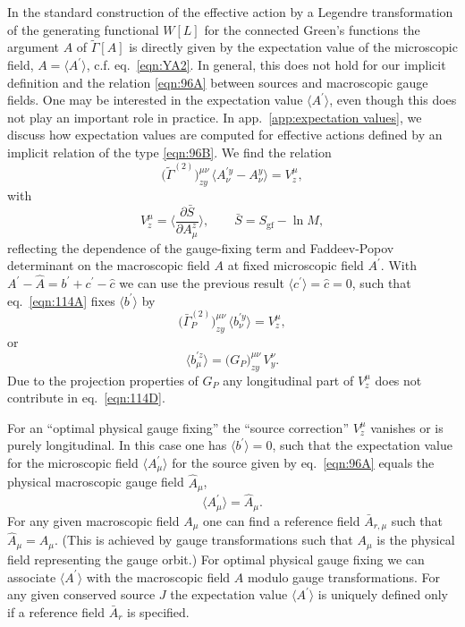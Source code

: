 \documentclass[twocolumn,aps,prd,amsmath,amssymb,preprintnumbers,longbibliography]{revtex4-1}
\numberwithin{equation}{section}
\begin{document}
In the standard construction of the effective action by a Legendre transformation of the generating functional $W[L]$ for the connected Green's functions the argument $A$ of $\tilde{\Gamma}[A]$ is directly given by the expectation value of the microscopic field, $A=\langle A^{\prime}\rangle$, c.f. eq.~\eqref{eqn:YA2}. In general, this does not hold for our implicit definition and the relation \eqref{eqn:96A} between sources and macroscopic gauge fields. One may be interested in the expectation value $\langle A^{\prime}\rangle$, even though this does not play an important role in practice. In app.~\ref{app:expectation values}, we discuss how expectation values are computed for effective actions defined by an implicit relation of the type \eqref{eqn:96B}. We find the relation
\begin{equation}\label{eqn:114A}
	\bigl(\tilde\Gamma^{(2)}\bigr)_{zy}^{\mu\nu} \, \langle A_\nu^{\prime y} - A_\nu^y\rangle
	= V_z^\mu,
\end{equation}
with
\begin{equation}\label{eqn:114B}
	V_z^\mu
	= \biggl\langle\frac{\partial \bar{S}}{\partial A_\mu^z}\biggr\rangle,
	\qquad
	\bar{S}
	= S_\text{gf} - \ln M,
\end{equation}
reflecting the dependence of the gauge-fixing term and Faddeev-Popov determinant on the macroscopic field $A$ at fixed microscopic field $A^\prime$. With $A^\prime - \hat{A} = b^\prime + c^\prime - \hat{c}$ we can use the previous result $\langle c^\prime\rangle = \hat{c} = 0$, such that eq.~\eqref{eqn:114A} fixes $\langle b^\prime\rangle$ by
\begin{equation}\label{eqn:114C}
	\bigl(\bar\Gamma_P^{(2)}\bigr)_{zy}^{\mu\nu} \, \langle b_\nu^{\prime y}\rangle
	= V_z^\mu,
\end{equation}
or
\begin{equation}\label{eqn:114D}
	\langle b_\mu^{\prime z}\rangle
	= \bigl(G_P\bigr)_{zy}^{\mu\nu} \, V_y^\nu.
\end{equation}
Due to the projection properties of $G_P$ any longitudinal part of $V_z^\mu$ does not contribute in eq.~\eqref{eqn:114D}.

For an ``optimal physical gauge fixing'' the ``source correction'' $V_z^\mu$ vanishes or is purely longitudinal. In this case one has $\langle b^\prime\rangle = 0$, such that the expectation value for the microscopic field $\langle A_\mu^\prime\rangle$ for the source given by eq.~\eqref{eqn:96A} equals the physical macroscopic gauge field $\hat{A}_\mu$,
\begin{equation}\label{eqn:103A}
	\langle A_\mu^\prime\rangle
	= \hat{A}_\mu.
\end{equation}
For any given macroscopic field $A_\mu$ one can find a reference field $\bar{A}_{r,\mu}$ such that $\hat{A}_\mu = A_\mu$. (This is achieved by gauge transformations such that $A_\mu$ is the physical field representing the gauge orbit.) For optimal physical gauge fixing we can associate $\langle A^\prime\rangle$ with the macroscopic field $A$ modulo gauge transformations. For any given conserved source $J$ the expectation value $\langle A^\prime\rangle$ is uniquely defined only if a reference field $\bar{A}_r$ is specified.
\end{document}
